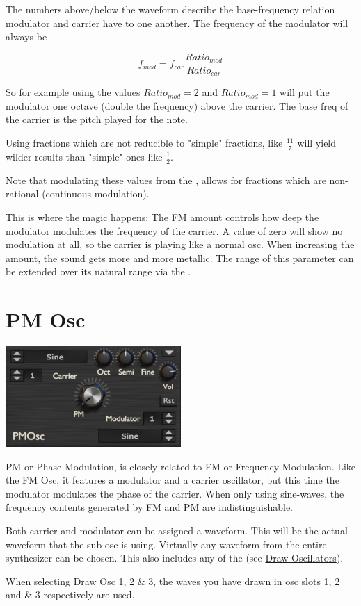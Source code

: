 {The numbers above/below the waveform describe the base-frequency relation modulator and carrier have to one another. The frequency of the modulator will always be

\begin{equation}
    f_{mod} = f_{car} \frac{Ratio_{mod}}{Ratio_{car}}
\end{equation}

So for example using the values $Ratio_{mod} = 2$ and $Ratio_{mod} = 1$ will put the modulator one octave (double the frequency) above the carrier. The base freq of the carrier is the pitch played for the note.

Using fractions which are not reducible to "simple" fractions, like $\frac{11}{7}$ will yield wilder results than "simple" ones like $\frac{1}{2}$.

Note that modulating these values from the \modmatrix, allows for fractions which are non-rational (continuous modulation).}

{This is where the magic happens: The FM amount controls how deep the modulator modulates the frequency of the carrier. A value of zero will show no modulation at all, so the carrier is playing like a normal osc. When increasing the amount, the sound gets more and more metallic. The range of this parameter can be extended over its natural range via the \modmatrix.}

\section{PM Osc}
\begin{center}
    \includegraphics[width=0.5\textwidth]{graphics/pm_osc.png}
\end{center}
PM or Phase Modulation, is closely related to FM or Frequency Modulation. Like the FM Osc, it features a modulator and a carrier oscillator, but this time the modulator modulates the phase of the carrier. When only using sine-waves, the frequency contents generated by FM and PM are indistinguishable.

{Both carrier and modulator can be assigned a waveform. This will be the actual waveform that the sub-osc is using. Virtually any waveform from the entire synthesizer can be chosen. This also includes any of the (see \hyperref[wavedraw]{Draw Oscillators}).

When selecting  Draw Osc 1, 2 \& 3, the waves you have drawn in osc slots 1, 2 and \& 3 respectively are used.}

